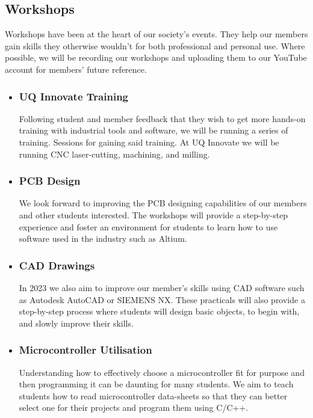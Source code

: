 \documentclass[a4paper,12pt]{report}
\begin{document}
\subsection*{Workshops}
Workshops have been at the heart of our society's events. They help our members gain skills they otherwise wouldn't for both professional and personal use.
Where possible, we will be recording our workshops and uploading them to our YouTube account for members' future reference.
\begin{itemize}
    \item \subsubsection*{UQ Innovate Training}
    Following student and member feedback that they wish to get more hands-on training with industrial tools and software, we will be running a series of training.
    Sessions for gaining said training. At UQ Innovate we will be running CNC laser-cutting, machining, and milling.
    \item \subsubsection*{PCB Design}
    We look forward to improving the PCB designing capabilities of our members and other students interested.
    The workshops will provide a step-by-step experience and foster an environment for students to learn how to use software used in the industry such as Altium.
    \item \subsubsection*{CAD Drawings}
    In 2023 we also aim to improve our member's skills using CAD software such as Autodesk AutoCAD or SIEMENS NX.
    These practicals will also provide a step-by-step process where students will design basic objects, to begin with, and slowly improve their skills.
    \item \subsubsection*{Microcontroller Utilisation}
    Understanding how to effectively choose a microcontroller fit for purpose and then programming it can be daunting for many students.
    We aim to teach students how to read microcontroller data-sheets so that they can better select one for their projects and program them using C/C++.

\end{itemize}
\end{document}
